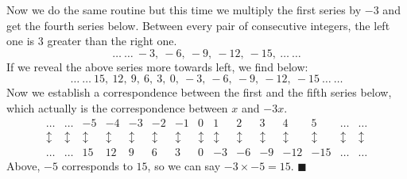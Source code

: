 \documentclass{article}
\begin{document}
Now we do the same routine but this time we multiply the first series by $-3$ and get the fourth series below. Between every pair of consecutive integers, the left one is $3$ greater than the right one.
\begin{equation}
	\ldots\ \ldots\ -3,\ -6,\ -9,\ -12,\ -15, \ \ldots\ \ldots
\end{equation}
If we reveal the above series more towards left, we find below:
\begin{equation}
	\ldots\ \ldots\ 15,\ 12,\ 9,\ 6,\ 3,\ 0,\ -3,\ -6,\ -9,\ -12,\ -15\ \ldots\ \ldots
\end{equation}
Now we establish a correspondence between the first and the fifth series below, which actually is the correspondence between $x$ and $-3x$. 
\[
\begin{array}{rrrrrrrrrrrrrrr}
\ldots & \ldots & -5 & -4 & -3 & -2 & -1 & 0 & 1 & 2 & 3 & 4 & 5 & \ldots & \ldots\\
\updownarrow & \updownarrow & \updownarrow & \updownarrow & \updownarrow & \updownarrow & \updownarrow & \updownarrow & \updownarrow & \updownarrow & \updownarrow & \updownarrow & \updownarrow & \updownarrow & \updownarrow\\
\ldots & \ldots & 15 & 12 & 9 & 6 & 3 & 0 & -3 & -6 & -9 & -12 & -15 & \ldots & \ldots
\end{array}
\]
Above, $-5$ corresponds to $15$, so we can say $-3 \times -5 = 15$. $\blacksquare$
\end{document}
